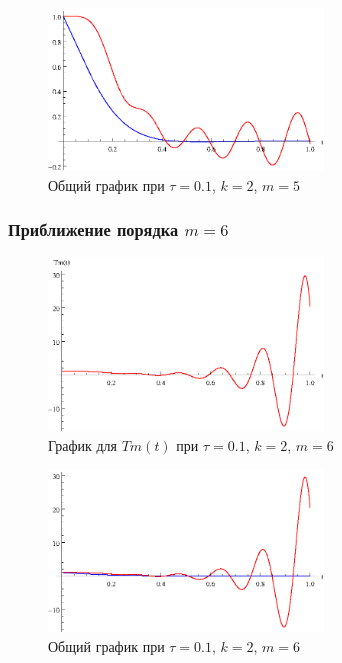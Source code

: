\begin{figure}[h]
\begin{center}
\includegraphics[width=0.65\textwidth]{./3_results/2_11.eps}
\end{center}
\caption{Общий график при $\tau=0.1$, $k=2$, $m=5$}
\end{figure}

\newpage

\subsubsection{Приближение порядка $m=6$}

\begin{figure}[h]
\begin{center}
\includegraphics[width=0.65\textwidth]{./3_results/2_12.eps}
\end{center}
\caption{График для $Tm(t)$ при $\tau=0.1$, $k=2$, $m=6$}
\end{figure}

\begin{figure}[h]
\begin{center}
\includegraphics[width=0.65\textwidth]{./3_results/2_13.eps}
\end{center}
\caption{Общий график при $\tau=0.1$, $k=2$, $m=6$}
\end{figure}